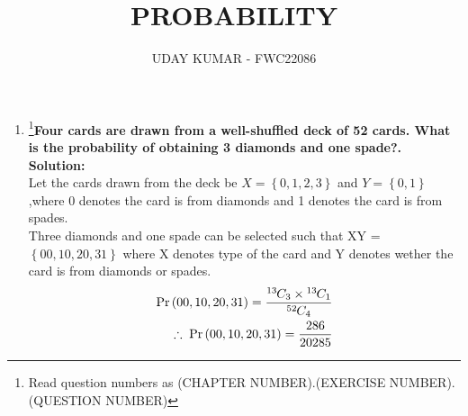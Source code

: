 \documentclass{article}
\providecommand{\cbrak}[1]{\ensuremath{\left\{#1\right\}}}
\newcommand{\solution}{\noindent \textbf{Solution: }}
\newcommand*{\permcomb}[4][0mu]{{{}^{#3}\mkern#1#2_{#4}}}
\newcommand*{\comb}[1][-1mu]{\permcomb[#1]{C}}
\begin{document}
\title{PROBABILITY}
\author{\Large UDAY KUMAR - FWC22086}
\date{}

\maketitle

\begin{enumerate}[label=16.\arabic{enumi}.\arabic{enumii}]%
\setcounter{enumi}{3}
\setcounter{enumii}{2}

\item \footnote{Read question numbers as (CHAPTER NUMBER).(EXERCISE NUMBER).(QUESTION NUMBER)}\textbf {Four cards are drawn from a well-shuffled deck of 52 cards. What is the probability of obtaining 3 diamonds and one spade?.}\\[1ex]
	\solution\\
		Let the cards drawn from the deck be $X = \cbrak{0,1,2,3}$ and $Y = \cbrak{0,1}$,where  0 denotes the card is from diamonds and  1 denotes the card is from spades.\\
		 Three diamonds and one spade can be selected such that  XY = $\cbrak{00,10,20,31}$ where X denotes type of the card   and Y denotes wether the card is from diamonds or spades.
  \\

 
	\begin{align}
	   \Pr{(00,10,20,31)} =\dfrac{\comb{13}{3} \times \comb{13}{1}}{\comb{52}{4}}\\ 
\therefore \;\Pr{(00,10,20,31)} = \frac{286}{20285}
\end{align}
\end{enumerate}
\end{document}
